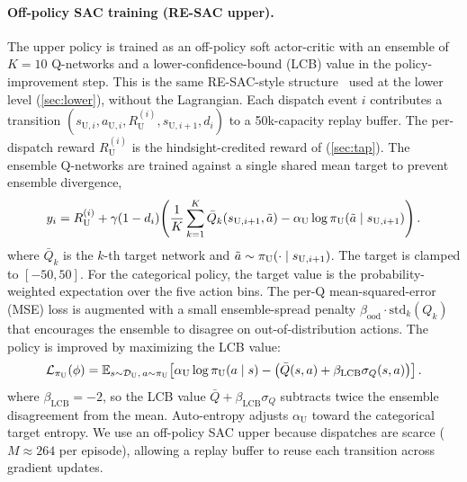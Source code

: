\paragraph{Off-policy SAC training (RE-SAC upper).}
The upper policy is trained as an off-policy soft actor-critic with an ensemble of $K{=}10$ Q-networks and a lower-confidence-bound (LCB) value in the policy-improvement step. This is the same RE-SAC-style structure~\citep{resac2026} used at the lower level (\cref{sec:lower}), without the Lagrangian. Each dispatch event $i$ contributes a transition $(s_{\mathrm{U},i}, a_{\mathrm{U},i}, R_{\mathrm{U}}^{(i)}, s_{\mathrm{U},i+1}, d_i)$ to a 50k-capacity replay buffer. The per-dispatch reward $R_{\mathrm{U}}^{(i)}$ is the hindsight-credited reward of  (\cref{sec:tap}). The ensemble Q-networks are trained against a single shared mean target to prevent ensemble divergence,
{\footnotesize
\begin{equation}
\label{eq:upper_q_target}
    y_i = R_{\mathrm{U}}^{(i)} + \gamma(1-d_i)\!\left(\frac{1}{K}\sum_{k=1}^{K}\bar{Q}_{k}(s_{\mathrm{U},i+1},\tilde{a}) - \alpha_{\mathrm{U}}\log\pi_{\mathrm{U}}(\tilde{a}\mid s_{\mathrm{U},i+1})\right).
\end{equation}
}
where $\bar{Q}_{k}$ is the $k$-th target network and $\tilde{a} \sim \pi_{\mathrm{U}}(\cdot\mid s_{\mathrm{U},i+1})$. The target is clamped to $[-50, 50]$. For the categorical policy, the target value is the probability-weighted expectation over the five action bins. The per-Q mean-squared-error (MSE) loss is augmented with a small ensemble-spread penalty $\beta_{\mathrm{ood}} \cdot \mathrm{std}_k(Q_k)$ that encourages the ensemble to disagree on out-of-distribution actions. The policy is improved by maximizing the LCB value:
{\footnotesize
\begin{equation}
\label{eq:upper_policy_loss}
    \mathcal{L}_{\pi_{\mathrm{U}}}(\phi) = \mathbb{E}_{s\sim\mathcal{D}_{\mathrm{U}},\,a\sim\pi_{\mathrm{U}}}\!\left[\alpha_{\mathrm{U}}\log\pi_{\mathrm{U}}(a\mid s) - \bigl(\bar{Q}(s,a) + \beta_{\mathrm{LCB}}\sigma_Q(s,a)\bigr)\right].
\end{equation}
}
where $\beta_{\mathrm{LCB}} = -2$, so the LCB value $\bar{Q} + \beta_{\mathrm{LCB}}\sigma_Q$ subtracts twice the ensemble disagreement from the mean. Auto-entropy adjusts $\alpha_{\mathrm{U}}$ toward the categorical target entropy. We use an off-policy SAC upper because dispatches are scarce ($M\!\approx\!264$ per episode), allowing a replay buffer to reuse each transition across gradient updates.

